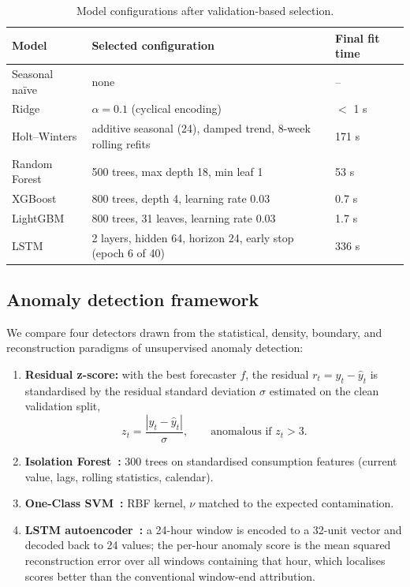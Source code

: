 \documentclass[10pt,a4paper]{article}
\begin{document}
\begin{table}[t]
\centering
\caption{Model configurations after validation-based selection.}
\label{tab:models}
\small
\begin{tabular*}{\textwidth}{@{\extracolsep{\fill}} l l l}
\toprule
\textbf{Model} & \textbf{Selected configuration} & \textbf{Final fit time} \\
\midrule
Seasonal na\"ive & none & -- \\
Ridge & $\alpha = 0.1$ (cyclical encoding) & $<$ 1 s \\
Holt--Winters & additive seasonal (24), damped trend, 8-week rolling refits & 171 s \\
Random Forest & 500 trees, max depth 18, min leaf 1 & 53 s \\
XGBoost & 800 trees, depth 4, learning rate 0.03 & 0.7 s \\
LightGBM & 800 trees, 31 leaves, learning rate 0.03 & 1.7 s \\
LSTM & 2 layers, hidden 64, horizon 24, early stop (epoch 6 of 40) & 336 s \\
\bottomrule
\end{tabular*}
\end{table}

\subsection{Anomaly detection framework}
We compare four detectors drawn from the statistical, density, boundary, and
reconstruction paradigms of unsupervised anomaly detection:
\begin{enumerate}[leftmargin=1.7em,itemsep=1pt,topsep=2pt]
\item \textbf{Residual z-score:} with the best forecaster $f$, the residual
  $r_t = y_t - \hat{y}_t$ is standardised by the residual standard deviation
  $\sigma$ estimated on the clean validation split,
  \begin{equation}\label{eq:zscore}
  z_t = \frac{\left|y_t - \hat{y}_t\right|}{\sigma}, \qquad
  \text{anomalous if } z_t > 3 .
  \end{equation}
\item \textbf{Isolation Forest~\cite{liu2008isolation}:} 300 trees on standardised
      consumption features (current value, lags, rolling statistics, calendar).
\item \textbf{One-Class SVM~\cite{scholkopf2001ocsvm}:} RBF kernel, $\nu$ matched to
      the expected contamination.
\item \textbf{LSTM autoencoder~\cite{sakurada2014autoencoder}:} a 24-hour window is
      encoded to a 32-unit vector and decoded back to 24 values; the per-hour
      anomaly score is the mean squared reconstruction error over all windows
      containing that hour, which localises scores better than the conventional
      window-end attribution.
\end{enumerate}
\end{document}
